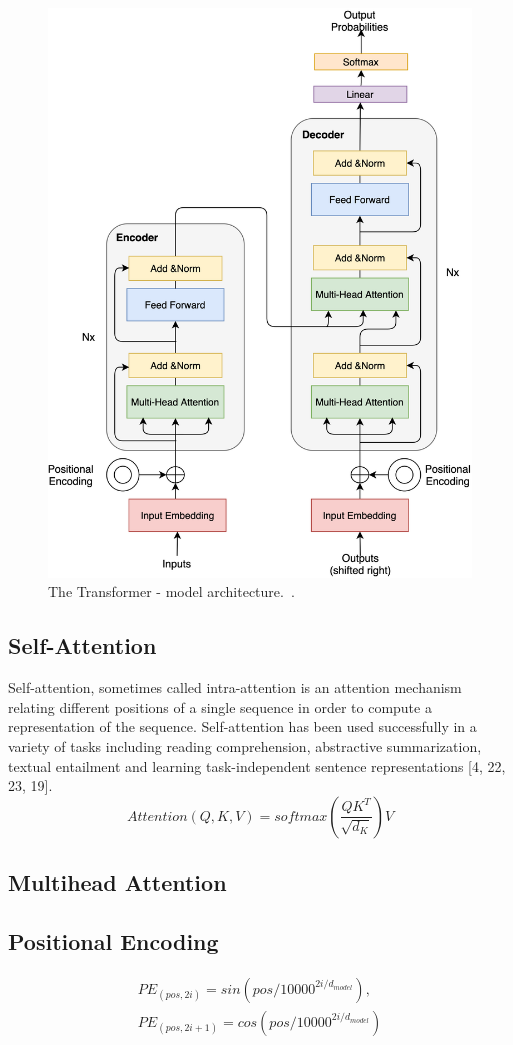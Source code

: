 \begin{figure}[!htbp]
	\centering
	\includegraphics[width = 0.5 \textwidth]{figures/transformer.png}
	\caption[The Transformer - model architecture]
	{ The Transformer - model architecture.~\cite{vaswani2017attention}.}
	\label{fig:transformer}
\end{figure}

\subsection{Self-Attention}
Self-attention, sometimes called intra-attention is an attention mechanism relating different positions of a single sequence in order to compute a representation of the sequence. Self-attention has been used successfully in a variety of tasks including reading comprehension, abstractive summarization, textual entailment and learning task-independent sentence representations [4, 22, 23, 19].
\begin{equation}
	Attention(Q,K,V)=softmax(\frac{QK^T}{\sqrt{d_K}})V
	\label{equ:self_attention}
\end{equation}

\subsection{Multihead Attention}
\subsection{Positional Encoding}

\begin{equation*}
	\begin{aligned}
	PE_{(pos,2i)} = sin(pos/10000^{2i/d_{model}}),\\
	PE_{(pos,2i+1)} = cos(pos/10000^{2i/d_{model}})
	\end{aligned}
\end{equation*}



